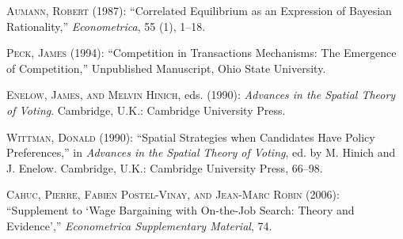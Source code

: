 \documentclass[ecta,nameyear,draft]{econsocart}
\theoremstyle{plain}
\theoremstyle{definition}
\begin{document}
\begin{thebibliography}{}
%
\textsc{Aumann, Robert} (1987):
``Correlated Equilibrium as an Expression of Bayesian Rationality,''
\textit{Econometrica}, 55 (1), 1--18.
\endbibitem

\textsc{Peck, James} (1994):
``Competition in Transactions Mechanisms: The Emergence of Competition,''
Unpublished Manuscript, Ohio State University.
\endbibitem

\textsc{Enelow, James, and Melvin Hinich}, eds. (1990):
\textit{Advances in the Spatial Theory of Voting}.
Cambridge, U.K.: Cambridge University Press.
\endbibitem

\textsc{Wittman, Donald} (1990):
``Spatial Strategies when Candidates Have Policy Preferences,''
in \textit{Advances in the Spatial Theory of Voting},
ed. by M. Hinich and J. Enelow.
Cambridge, U.K.: Cambridge University Press, 66--98.
\endbibitem

\textsc{Cahuc, Pierre, Fabien Postel-Vinay, and Jean-Marc Robin} (2006): ``Supplement to `Wage Bargaining with On-the-Job Search: Theory and Evidence',''
\textit{Econometrica Supplementary Material}, 74.
\endbibitem
\end{thebibliography}
\end{document}
